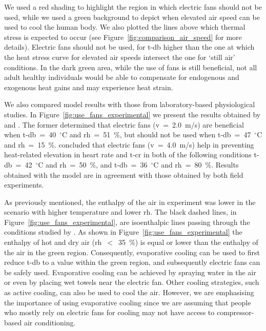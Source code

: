 We used a red shading to highlight the region in which electric fans should not be used, while we used a green background to depict when elevated air speed can be used to cool the human body.
We also plotted the lines above which thermal stress is expected to occur (see Figure~\ref{fig:comparison_air_speed} for more details).
Electric fans should not be used, for \ac{t-db} higher than the one at which the heat stress curve for elevated air speeds intersect the one for `still air' conditions.
In the dark green area, while the use of fans is still beneficial, not all adult healthy individuals would be able to compensate for endogenous and exogenous heat gains and may experience heat strain.

We also compared  model results with those from laboratory-based physiological studies.
In Figure~\ref{fig:use_fans_experimental} we present the results obtained by  and .
The former determined that electric fans (\ac{v}~=~2.0~m/s) are beneficial when \ac{t-db}~=~40~$^{\circ}$C and \ac{rh}~=~51~\%, but should not be used when \ac{t-db}~=~47~$^{\circ}$C and \ac{rh}~=~15~\%.
 concluded that electric fans (\ac{v}~=~4.0~m/s) help in preventing heat-related elevation in heart rate and \ac{t-cr} in both of the following conditions \ac{t-db}~=~42~$^{\circ}$C and \ac{rh}~=~50~\%, and \ac{t-db}~=~36~$^{\circ}$C and \ac{rh}~=~80~\%.
Results obtained with the  model are in agreement with those obtained by both field experiments.

As previously mentioned, the enthalpy of the air in  experiment was lower in the scenario with higher temperature and lower \ac{rh}.
The black dashed lines, in Figure~\ref{fig:use_fans_experimental}, are isoenthalpic lines passing through the conditions studied by .
As shown in Figure~\ref{fig:use_fans_experimental} the enthalpy of hot and dry air (\ac{rh}~$<$~35~\%) is equal or lower than the enthalpy of the air in the green region.
Consequently, evaporative cooling can be used to first reduce \ac{t-db} to a value within the green region, and subsequently electric fans can be safely used.
Evaporative cooling can be achieved by spraying water in the air or even by placing wet towels near the electric fan.
Other cooling strategies, such as active cooling, can also be used to cool the air.
However, we are emphasising the importance of using evaporative cooling since we are assuming that people who mostly rely on electric fans for cooling may not have access to compressor-based air conditioning.

